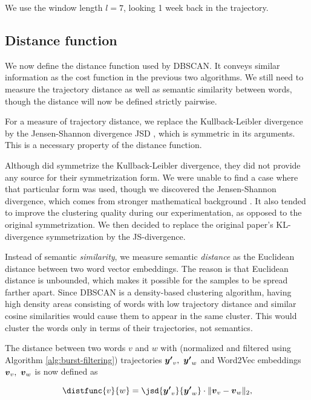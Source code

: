 We use the window length $l = 7$, looking 1 week back in the trajectory.


\subsection{Distance function}
We now define the distance function used by DBSCAN. It conveys similar information as the cost function in the previous two algorithms. We still need to measure the trajectory distance as well as semantic similarity between words, though the distance will now be defined strictly pairwise.

For a measure of trajectory distance, we replace the Kullback-Leibler divergence by the Jensen-Shannon divergence JSD \citep{js-divergence-1}, which is symmetric in its arguments. This is a necessary property of the distance function.

Although \cite{event-detection} did symmetrize the Kullback-Leibler divergence, they did not provide any source for their symmetrization form. We were unable to find a case where that particular form was used, though we discovered the Jensen-Shannon divergence, which comes from stronger mathematical background \citep{js-divergence-1, js-divergence-2}. It also tended to improve the clustering quality during our experimentation, as opposed to the original symmetrization. We then decided to replace the original paper's KL-divergence symmetrization by the JS-divergence.

Instead of semantic \textit{similarity}, we measure semantic \textit{distance} as the Euclidean distance between two word vector embeddings. The reason is that Euclidean distance is unbounded, which makes it possible for the samples to be spread farther apart. Since DBSCAN is a density-based clustering algorithm, having high density areas consisting of words with low trajectory distance and similar cosine similarities would cause them to appear in the same cluster. This would cluster the words only in terms of their trajectories, not semantics.

The distance between two words $v$ and $w$ with (normalized and filtered using Algorithm \ref{alg:burst-filtering}) trajectories $\vect{\trajn}_{v},\ \vect{\trajn}_{w}$ and Word2Vec embeddings $\embed_{v},\ \embed_{w}$ is now defined as

\begin{equation}
	\distfunc{v}{w} = \jsd{\vect{\trajn}_{v}}{\vect{\trajn}_{w}} \cdot \| \embed_{v} - \embed_{w}\|_{2},
\end{equation}

